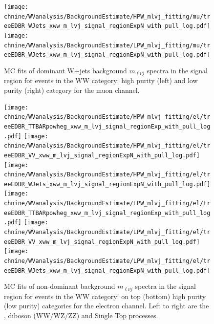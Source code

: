 \begin{figure}[htbp]
\centering
\texttt{[image: \\chnine/WVanalysis/BackgroundEstimate/HPW\_mlvj\_fitting/mu/treeEDBR\_WJets\_xww\_m\_lvj\_signal\_regionExpN\_with\_pull\_log.pdf]}
\texttt{[image: \\chnine/WVanalysis/BackgroundEstimate/LPW\_mlvj\_fitting/mu/treeEDBR\_WJets\_xww\_m\_lvj\_signal\_regionExpN\_with\_pull\_log.pdf]}\\
\caption{MC fits of dominant W+jets background $m_{\ell\nu j}$ spectra in the \mJ signal region for events in the WW category:
high purity (left) and low purity (right) category for the muon channel.}
\label{fig:srWfitmlvj_1b}
\end{figure}


\begin{figure}[htbp]
\centering
\texttt{[image: \\chnine/WVanalysis/BackgroundEstimate/HPW\_mlvj\_fitting/el/treeEDBR\_TTBARpowheg\_xww\_m\_lvj\_signal\_regionExp\_with\_pull\_log.pdf]}
\texttt{[image: \\chnine/WVanalysis/BackgroundEstimate/HPW\_mlvj\_fitting/el/treeEDBR\_VV\_xww\_m\_lvj\_signal\_regionExpN\_with\_pull\_log.pdf]}
\texttt{[image: \\chnine/WVanalysis/BackgroundEstimate/HPW\_mlvj\_fitting/el/treeEDBR\_WJets\_xww\_m\_lvj\_signal\_regionExpN\_with\_pull\_log.pdf]}\\
\texttt{[image: \\chnine/WVanalysis/BackgroundEstimate/LPW\_mlvj\_fitting/el/treeEDBR\_TTBARpowheg\_xww\_m\_lvj\_signal\_regionExp\_with\_pull\_log.pdf]}
\texttt{[image: \\chnine/WVanalysis/BackgroundEstimate/LPW\_mlvj\_fitting/el/treeEDBR\_VV\_xww\_m\_lvj\_signal\_regionExpN\_with\_pull\_log.pdf]}
\texttt{[image: \\chnine/WVanalysis/BackgroundEstimate/LPW\_mlvj\_fitting/el/treeEDBR\_WJets\_xww\_m\_lvj\_signal\_regionExpN\_with\_pull\_log.pdf]}\\
\caption{MC fits of non-dominant background $m_{\ell\nu j}$ spectra in the \mJ signal region for events in the WW category: on top (bottom) high purity (low purity) categories for the electron channel. Left to right are the \ttbar, diboson (WW/WZ/ZZ) and Single Top processes.}
\label{fig:srWfitmlvj_2}
\end{figure}

